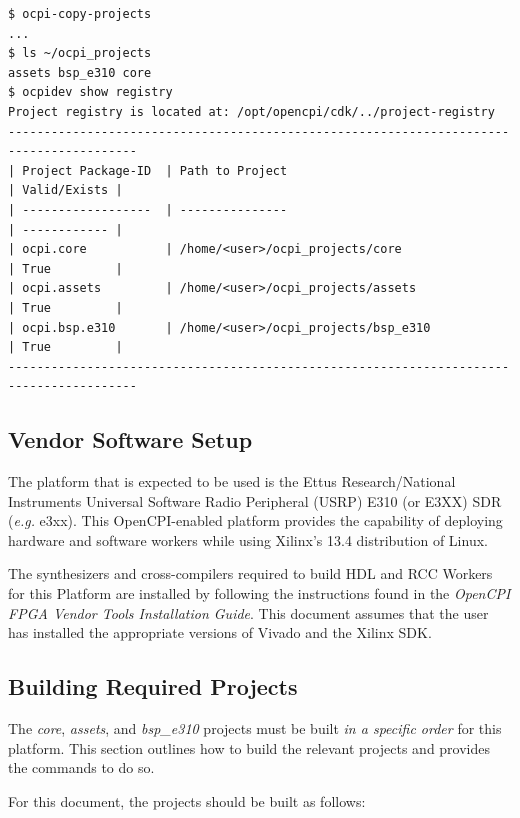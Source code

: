 \begin{flushleft}
\begin{verbatim}
$ ocpi-copy-projects
...
$ ls ~/ocpi_projects
assets bsp_e310 core
$ ocpidev show registry
Project registry is located at: /opt/opencpi/cdk/../project-registry
----------------------------------------------------------------------------------------
| Project Package-ID  | Path to Project                                 | Valid/Exists |
| ------------------  | ---------------                                 | ------------ |
| ocpi.core           | /home/<user>/ocpi_projects/core                   | True         |
| ocpi.assets         | /home/<user>/ocpi_projects/assets                 | True         |
| ocpi.bsp.e310       | /home/<user>/ocpi_projects/bsp_e310               | True         |
----------------------------------------------------------------------------------------
\end{verbatim}

\subsection{Vendor Software Setup}
The platform that is expected to be used is the Ettus Research/National Instruments Universal Software Radio Peripheral (USRP) E310 (or E3XX) SDR (\textit{e.g.} e3xx). This OpenCPI-enabled platform provides the capability of deploying hardware and software workers while using Xilinx's 13.4 distribution of Linux.\\ \bigskip

The synthesizers and cross-compilers required to build HDL and RCC Workers for this Platform are installed by following the instructions found in the \textit{OpenCPI FPGA Vendor Tools Installation Guide}. This document assumes that the user has installed the appropriate versions of Vivado and the Xilinx SDK.\\ \bigskip

\subsection{Building Required Projects}
\label{sec:Building OpenCPI projects}
The \textit{core}, \textit{assets}, and \textit{bsp\_e310} projects must be built \textit{in a specific order} for this platform. This section outlines how to build the relevant projects and provides the commands to do so.\medskip

For this document, the projects should be built as follows:\\


\end{flushleft}
